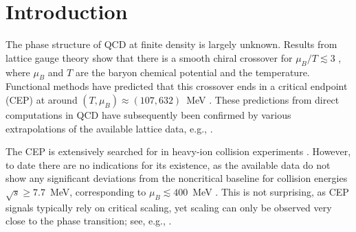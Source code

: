 \documentclass[reprint,english,superscriptaddress,preprintnumbers,amsmath,amssymb,aps,prd,nofootinbib]{revtex4-2}
\begin{document}
\maketitle
	
\section{Introduction}

The phase structure of QCD at finite density is largely unknown. Results from lattice gauge theory show that there is a smooth chiral crossover for $\mu_B/T \lesssim 3$ \cite{HotQCD:2018pds,Borsanyi:2020fev}, where $\mu_B$ and $T$ are the baryon chemical potential and the temperature. Functional methods have predicted that this crossover ends in a critical endpoint (CEP) at around $(T,\mu_B) \approx (107,632)$~MeV \cite{Fu:2019hdw, Gao:2020fbl, Gunkel:2021oya}. These predictions from direct computations in QCD have subsequently been confirmed by various extrapolations of the available lattice data, e.g., \cite{Basar:2023nkp, Hippert:2023bel, Clarke:2024ugt, Shah:2024img}.



The CEP is extensively searched for in heavy-ion collision experiments \cite{Luo:2017faz, Bzdak:2019pkr}. However, to date there are no indications for its existence, as the available data do not show any significant deviations from the noncritical baseline for collision energies $\sqrt{s} \geq 7.7$~MeV, corresponding to $\mu_B \lesssim 400$~MeV \cite{STAR:BES2}. This is not surprising, as CEP signals typically rely on critical scaling, yet scaling can only be observed very close to the phase transition; see, e.g., \cite{Braun:2010vd, Schaefer:2011ex, Fu:2019hdw, Braun:2020ada, Gao:2021vsf, Fu:2023lcm, Bernhardt:2023hpr, Braun:2023qak, Lu:2023mkn}.
\end{document}
